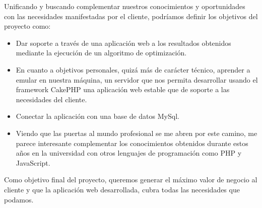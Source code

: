 
Unificando y buscando complementar nuestros conocimientos y oportunidades con las necesidades manifestadas por el cliente, podríamos definir los objetivos del proyecto como:

\begin{itemize}
	\item Dar soporte a través de una aplicación web a los resultados obtenidos mediante la ejecución de un algoritmo de optimización.
	
	\item En cuanto a objetivos personales, quizá más de carácter técnico, aprender a emular en nuestra máquina, un servidor que nos permita desarrollar usando el framework CakePHP una aplicación web estable que de soporte a las necesidades del cliente.
	
	\item Conectar la aplicación con una base de datos MySql.
	
	\item Viendo que las puertas al mundo profesional se me abren por este camino, me parece interesante complementar los conocimientos obtenidos durante estos años en la universidad con otros lenguajes de programación como PHP y JavaScript.
\end{itemize}

Como objetivo final del proyecto, queremos generar el máximo valor de negocio al cliente y que la aplicación web desarrollada, cubra todas las necesidades que podamos.
